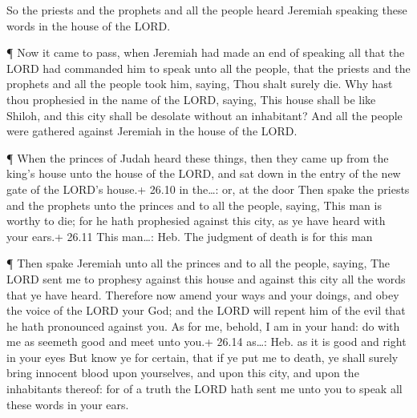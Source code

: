  So the priests and the prophets and all the people heard
Jeremiah speaking these words in the house of the LORD.

 ¶ Now it came to pass, when Jeremiah had made an end of
speaking all that the LORD had commanded him to speak unto all the
people, that the priests and the prophets and all the people took him,
saying, Thou shalt surely die.  Why hast thou prophesied in
the name of the LORD, saying, This house shall be like Shiloh, and this
city shall be desolate without an inhabitant? And all the people were
gathered against Jeremiah in the house of the LORD.

 ¶ When the princes of Judah heard these things, then they
came up from the king's house unto the house of the LORD, and sat down
in the entry of the new gate of the LORD's house.+ 26.10 in the\ldots:
or, at the door  Then spake the priests and the prophets
unto the princes and to all the people, saying, This man is worthy to
die; for he hath prophesied against this city, as ye have heard with
your ears.+ 26.11 This man\ldots: Heb. The judgment of death is for this
man

 ¶ Then spake Jeremiah unto all the princes and to all the
people, saying, The LORD sent me to prophesy against this house and
against this city all the words that ye have heard. 
Therefore now amend your ways and your doings, and obey the voice of the
LORD your God; and the LORD will repent him of the evil that he hath
pronounced against you.  As for me, behold, I am in your
hand: do with me as seemeth good and meet unto you.+ 26.14 as\ldots:
Heb. as it is good and right in your eyes  But know ye for
certain, that if ye put me to death, ye shall surely bring innocent
blood upon yourselves, and upon this city, and upon the inhabitants
thereof: for of a truth the LORD hath sent me unto you to speak all
these words in your ears.

